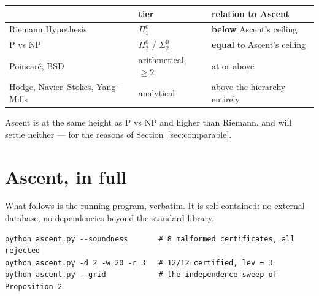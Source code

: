 \documentclass[11pt,a4paper]{article}
\newcommand{\Sig}[2]{\Sigma^{#1}_{#2}}
\newcommand{\Pai}[2]{\Pi^{#1}_{#2}}
\begin{document}
\begin{center}
\begin{tabular}{@{}lll@{}}
\toprule
& tier & relation to Ascent \\
\midrule
Riemann Hypothesis & $\Pai{0}{1}$ & \textbf{below} Ascent's ceiling \\
P vs NP & $\Pai{0}{2}$ / $\Sig{0}{2}$ & \textbf{equal} to Ascent's ceiling \\
Poincar\'e, BSD & arithmetical, $\ge 2$ & at or above \\
Hodge, Navier--Stokes, Yang--Mills & analytical & above the hierarchy entirely \\
\bottomrule
\end{tabular}
\end{center}

Ascent is at the same height as P vs NP and higher than Riemann, and will
settle neither --- for the reasons of Section~\ref{sec:comparable}.

\section{Ascent, in full}\label{app:code}

What follows is the running program, verbatim. It is self-contained: no
external database, no dependencies beyond the standard library.

\begin{verbatim}
python ascent.py --soundness       # 8 malformed certificates, all rejected
python ascent.py -d 2 -w 20 -r 3   # 12/12 certified, lev = 3
python ascent.py --grid            # the independence sweep of Proposition 2
\end{verbatim}


\end{document}
